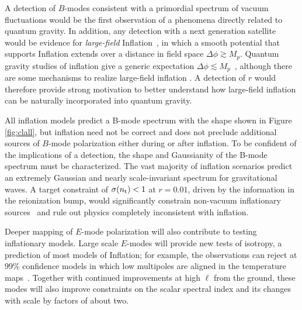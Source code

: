 A detection of $B$-modes consistent with a primordial spectrum of vacuum fluctuations would be the first observation 
of a phenomena directly related to quantum gravity. In addition, any detection with a next generation satellite would be 
evidence for {\it large-field} Inflation~\cite{Lyth:1996im}, in which a smooth potential that supports Inflation extends over 
a distance in field space $\Delta\phi \gtrsim M_p$. Quantum gravity studies of inflation give a generic 
expectation $\Delta\phi \lesssim M_p$~\cite{Banks:2003sx,Baumann:2014nda,Brown:2015iha,Rudelius:2015xta}, although 
there are some mechanisms to realize large-field inflation \cite{Silverstein:2008sg,Kaloper:2008fb,Marchesano:2014mla,Blumenhagen:2015xpa}. 
A detection of $r$ would therefore provide strong 
motivation to better understand how large-field inflation can be naturally incorporated into quantum gravity. 

All inflation models predict a B-mode spectrum with the shape shown in Figure \ref{fig:clall}, but inflation 
need not be correct \cite{Khoury:2001bz,Brandenberger:2012zb,Ijjas:2015hcc} and does not preclude additional sources of $B$-mode polarization either during or after 
inflation. To be confident of the implications of a detection, the shape and Gaussianity of the B-mode spectrum 
must be characterized. The vast majority of inflation scenarios predict an extremely Gaussian and nearly scale-invariant spectrum for 
gravitational waves. A target constraint of $\sigma(n_{\rm t})<1$ at $r=0.01$, driven by the information in the reionization bump, would significantly constrain non-vacuum 
inflationary sources~\cite{Namba:2015gja,Peloso:2016gqs} and rule out physics completely inconsistent with inflation. 

Deeper mapping of $E$-mode polarization will also contribute to testing inflationary models. Large scale $E$-modes will 
provide new tests of isotropy, a prediction of most models of Inflation;  
for example, the observations can reject at 99\% confidence models in which low multipoles are aligned in the temperature maps~\cite{Dvorkin:2007jp}. 
Together with continued improvements at high $\ell$ from the ground, these modes will also improve constraints on the scalar 
spectral index and its changes with scale by factors of about two. 

